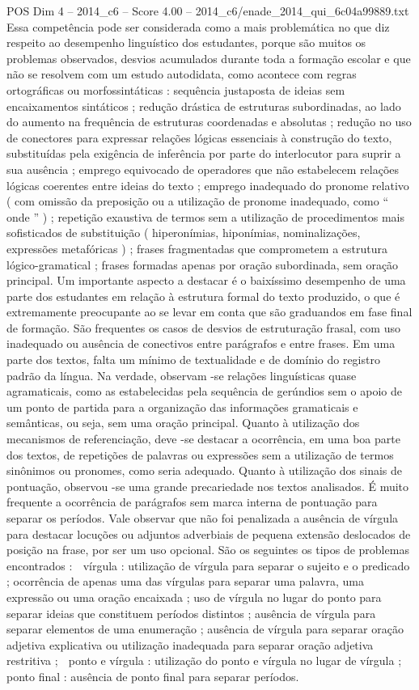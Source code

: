 \begin{textsample}{POS Dim 4 – 2014\_c6 – Score 4.00 – 2014\_c6/enade\_2014\_qui\_6c04a99889.txt}
Essa competência pode ser considerada como a mais problemática no que diz respeito ao desempenho linguístico dos estudantes, porque são muitos os problemas observados, desvios acumulados durante toda a formação escolar e que não se resolvem com um estudo autodidata, como acontece com regras ortográficas ou morfossintáticas : sequência justaposta de ideias sem encaixamentos sintáticos ; redução drástica de estruturas subordinadas, ao lado do aumento na frequência de estruturas coordenadas e absolutas ; redução no uso de conectores para expressar relações lógicas essenciais à construção do texto, substituídas pela exigência de inferência por parte do interlocutor para suprir a sua ausência ; emprego equivocado de operadores que não estabelecem relações lógicas coerentes entre ideias do texto ; emprego inadequado do pronome relativo ( com omissão da preposição ou a utilização de pronome inadequado, como “ onde ” ) ; repetição exaustiva de termos sem a utilização de procedimentos mais sofisticados de substituição ( hiperonímias, hiponímias, nominalizações, expressões metafóricas ) ; frases fragmentadas que comprometem a estrutura lógico-gramatical ; frases formadas apenas por oração subordinada, sem oração principal.
Um importante aspecto a destacar é o baixíssimo desempenho de uma parte dos estudantes em relação à estrutura formal do texto produzido, o que é extremamente preocupante ao se levar em conta que são graduandos em fase final de formação.
São frequentes os casos de desvios de estruturação frasal, com uso inadequado ou ausência de conectivos entre parágrafos e entre frases.
Em uma parte dos textos, falta um mínimo de textualidade e de domínio do registro padrão da língua.
Na verdade, observam -se relações linguísticas quase agramaticais, como as estabelecidas pela sequência de gerúndios sem o apoio de um ponto de partida para a organização das informações gramaticais e semânticas, ou seja, sem uma oração principal.
Quanto à utilização dos mecanismos de referenciação, deve -se destacar a ocorrência, em uma boa parte dos textos, de repetições de palavras ou expressões sem a utilização de termos sinônimos ou pronomes, como seria adequado.
Quanto à utilização dos sinais de pontuação, observou -se uma grande precariedade nos textos analisados.
É muito frequente a ocorrência de parágrafos sem marca interna de pontuação para separar os períodos.
Vale observar que não foi penalizada a ausência de vírgula para destacar locuções ou adjuntos adverbiais de pequena extensão deslocados de posição na frase, por ser um uso opcional.
São os seguintes os tipos de problemas encontrados :  vírgula : utilização de vírgula para separar o sujeito e o predicado ; ocorrência de apenas uma das vírgulas para separar uma palavra, uma expressão ou uma oração encaixada ; uso de vírgula no lugar do ponto para separar ideias que constituem períodos distintos ; ausência de vírgula para separar elementos de uma enumeração ; ausência de vírgula para separar oração adjetiva explicativa ou utilização inadequada para separar oração adjetiva restritiva ;  ponto e vírgula : utilização do ponto e vírgula no lugar de vírgula ;  ponto final : ausência de ponto final para separar períodos.

\end{textsample}
